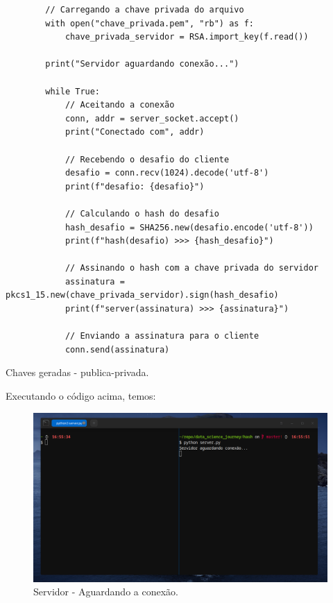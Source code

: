 \documentclass[a4paper,12pt]{article}
\begin{document}
\begin{listing}[!ht]
    \begin{verbatim}
        // Carregando a chave privada do arquivo
        with open("chave_privada.pem", "rb") as f:
            chave_privada_servidor = RSA.import_key(f.read())
    
        print("Servidor aguardando conexão...")

        while True:
            // Aceitando a conexão
            conn, addr = server_socket.accept()
            print("Conectado com", addr)

            // Recebendo o desafio do cliente
            desafio = conn.recv(1024).decode('utf-8')
            print(f"desafio: {desafio}")

            // Calculando o hash do desafio
            hash_desafio = SHA256.new(desafio.encode('utf-8'))
            print(f"hash(desafio) >>> {hash_desafio}")

            // Assinando o hash com a chave privada do servidor
            assinatura = pkcs1_15.new(chave_privada_servidor).sign(hash_desafio)
            print(f"server(assinatura) >>> {assinatura}")

            // Enviando a assinatura para o cliente
            conn.send(assinatura)
\end{verbatim}
\caption{Chaves geradas - publica-privada.}
\end{listing}

\newpage
Executando o c\'odigo acima, temos:

\begin{figure}[!ht]
    \centering 
    \includegraphics[scale=0.38]{images/server.png}
    \caption{Servidor - Aguardando a conex\~ao.}
    \label{fig:server-running}
\end{figure}
\end{document}
